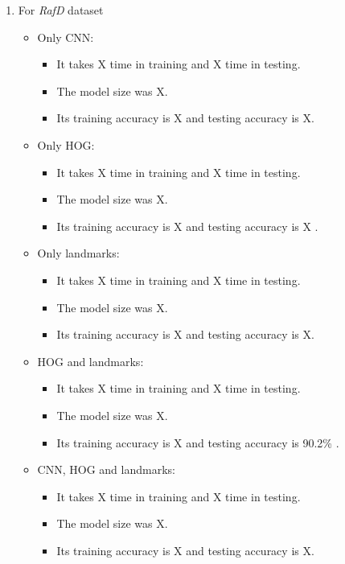 \begin{enumerate}
\begin{itemize}
\begin{itemize}
        \end{itemize}
\end{itemize}
\item For \textit{RafD} dataset \newline
\begin{itemize}
    \item Only CNN: 
        \begin{itemize}
            \item It takes X time in training and X time in testing.
            \item The model size was X.
            \item Its training accuracy is X and testing accuracy is X.
        \end{itemize}
    \item Only HOG: 
        \begin{itemize}
            \item It takes X time in training and X time in testing.
            \item The model size was X.
            \item Its training accuracy is X and testing accuracy is X .
        \end{itemize}
    \item Only landmarks: 
        \begin{itemize}
            \item It takes X time in training and X time in testing.
            \item The model size was X.
            \item Its training accuracy is X and testing accuracy is X.
        \end{itemize}
    \item HOG and landmarks: 
        \begin{itemize}
            \item It takes X time in training and X time in testing.
            \item The model size was X.
            \item Its training accuracy is X and testing accuracy is 90.2\% .
        \end{itemize}
    \item CNN, HOG and landmarks: 
        \begin{itemize}
            \item It takes X time in training and X time in testing.
            \item The model size was X.
            \item Its training accuracy is X and testing accuracy is X.

\end{itemize}
\end{itemize}
\end{enumerate}
